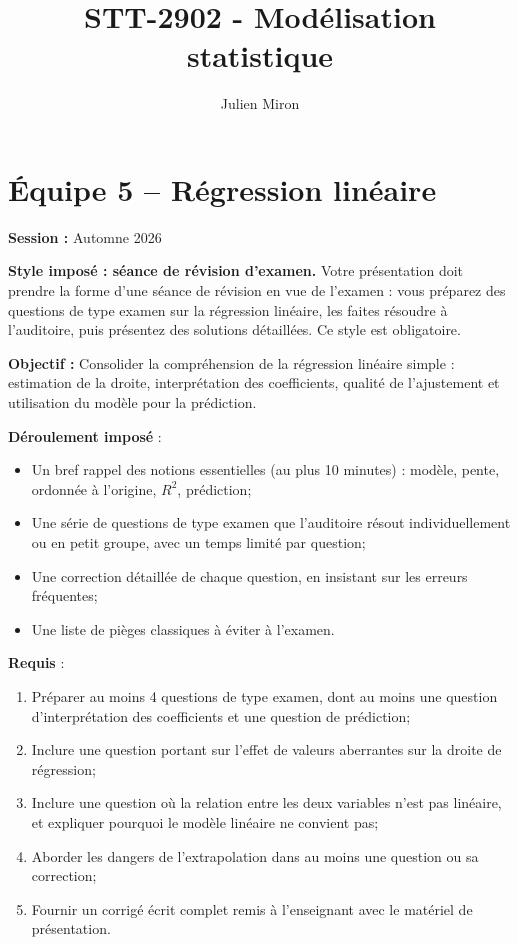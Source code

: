 \documentclass{article}
\title{STT-2902 - Modélisation statistique}
\author{Julien Miron}
\begin{document}
\section*{Équipe 5 – Régression linéaire}

\textbf{Session :} Automne 2026

\textbf{Style imposé : séance de révision d'examen.} Votre présentation doit prendre la forme d'une séance de révision en vue de l'examen : vous préparez des questions de type examen sur la régression linéaire, les faites résoudre à l'auditoire, puis présentez des solutions détaillées. Ce style est obligatoire.

\vspace{0.5cm}
\textbf{Objectif :} Consolider la compréhension de la régression linéaire simple : estimation de la droite, interprétation des coefficients, qualité de l'ajustement et utilisation du modèle pour la prédiction.

\vspace{0.5cm}
\textbf{Déroulement imposé} :
\begin{itemize}
    \item Un bref rappel des notions essentielles (au plus 10 minutes) : modèle, pente, ordonnée à l'origine, $R^2$, prédiction;
    \item Une série de questions de type examen que l'auditoire résout individuellement ou en petit groupe, avec un temps limité par question;
    \item Une correction détaillée de chaque question, en insistant sur les erreurs fréquentes;
    \item Une liste de \og pièges classiques \fg{} à éviter à l'examen.
\end{itemize}

\vspace{0.5cm}
\textbf{Requis} :
\begin{enumerate}
    \item Préparer au moins 4 questions de type examen, dont au moins une question d'interprétation des coefficients et une question de prédiction;
    \item Inclure une question portant sur l'effet de valeurs aberrantes sur la droite de régression;
    \item Inclure une question où la relation entre les deux variables n'est pas linéaire, et expliquer pourquoi le modèle linéaire ne convient pas;
    \item Aborder les dangers de l'extrapolation dans au moins une question ou sa correction;
    \item Fournir un corrigé écrit complet remis à l'enseignant avec le matériel de présentation.
\end{enumerate}
\end{document}
